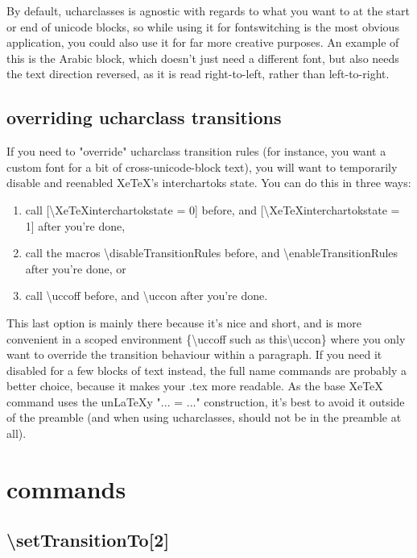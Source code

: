 ﻿\documentclass{article}
\newenvironment{numberlist}{%
  \begin{enumerate}
	\setlength{\itemsep}{0pt}
	\setlength{\parsep}{0pt}
	\setlength{\topsep}{0pt}
	\setlength{\partopsep}{0pt}
	\setlength{\parskip}{0pt}
	\setlength{\labelsep}{5pt}}%
{
  \end{enumerate}}
\begin{document}
		By default, ucharclasses is agnostic with regards to what you want to at the start or end of unicode blocks, so while using it for fontswitching is the most obvious application, you could also use it for far more creative purposes. An example of this is the Arabic block, which doesn't just need a different font, but also needs the text direction reversed, as it is read right-to-left, rather than left-to-right.

		\subsection{overriding ucharclass transitions}
		
			If you need to "override" ucharclass transition rules (for instance, you want a custom font for a bit of cross-unicode-block text), you will want to temporarily disable and reenabled XeTeX's interchartoks state. You can do this in three ways:
			
			\begin{numberlist}
				\item call [\textbackslash XeTeXinterchartokstate = 0] before, and [\textbackslash XeTeXinterchartokstate = 1] after you're done,
				\item call the macros \textbackslash disableTransitionRules before, and \textbackslash enableTransitionRules after you're done, or
				\item call \textbackslash uccoff before, and \textbackslash uccon after you're done.
			\end{numberlist}
			
			This last option is mainly there because it's nice and short, and is more convenient in a scoped environment \{\textbackslash uccoff such as this\textbackslash uccon\} where you only want to override the transition behaviour within a paragraph. If you need it disabled for a few blocks of text instead, the full name commands are probably a better choice, because it makes your .tex more readable. As the base XeTeX command uses the un\LaTeX y "... = ..." construction, it's best to avoid it outside of the preamble (and when using ucharclasses, should not be in the preamble at all).

	\section{commands}
		
		\subsection{\textbackslash setTransitionTo[2]}
\end{document}
